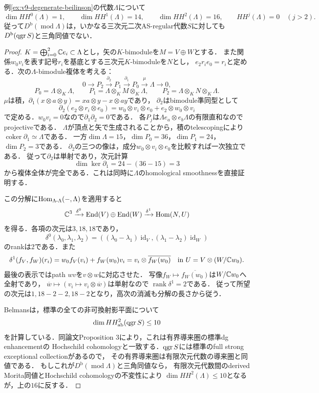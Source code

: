 \documentclass[11pt,a4paper]{ltjsarticle}
\begin{document}
\begin{proposition}
\label{prop:v9-degenerate-beilinson-hochschild}
例\ref{ex:v9-degenerate-beilinson}の代数$\Lambda$について
\[
 \dim HH^0(\Lambda)=1,\qquad
 \dim HH^1(\Lambda)=14,\qquad
 \dim HH^2(\Lambda)=16,
 \qquad HH^j(\Lambda)=0\quad(j>2).
\]
従って$D^{\mathrm b}(\operatorname{mod}\Lambda)$は，いかなる三次元二次AS-regular代数$S$に対しても
$D^{\mathrm b}(\operatorname{qgr} S)$と三角同値でない．
\end{proposition}
\begin{proof}
$K=\bigoplus_{i=0}^2\mathbb C e_i\subset\Lambda$とし，矢の$K$-bimoduleを$M=V\oplus W$とする．
また関係$w_0v_i$を表す記号$r_i$を基底とする三次元$K$-bimoduleを$N$とし，
$e_2r_ie_0=r_i$と定める．次の$\Lambda$-bimodule複体を考える：
\[
 0\longrightarrow P_2\xrightarrow{\partial_2}P_1
 \xrightarrow{\partial_1}P_0\xrightarrow{\mu}\Lambda\longrightarrow0,
\]
\[
 P_0=\Lambda\otimes_K\Lambda,\qquad
 P_1=\Lambda\otimes_K M\otimes_K\Lambda,\qquad
 P_2=\Lambda\otimes_K N\otimes_K\Lambda.
\]
$\mu$は積，$\partial_1(x\otimes a\otimes y)=xa\otimes y-x\otimes ay$であり，
$\partial_2$はbimodule準同型として
\[
 \partial_2(e_2\otimes r_i\otimes e_0)
 =w_0\otimes v_i\otimes e_0+e_2\otimes w_0\otimes v_i
\]
で定める．$w_0v_i=0$なので$\partial_1\partial_2=0$である．
各$P_j$は$\Lambda e_a\otimes e_b\Lambda$の有限直和なのでprojectiveである．
$\Lambda$が頂点と矢で生成されることから，積のtelescopingにより
$\operatorname{coker}\partial_1\simeq\Lambda$である．
一方$\dim\Lambda=15$，$\dim P_0=36$，$\dim P_1=24$，$\dim P_2=3$である．
$\partial_2$の三つの像は，成分$w_0\otimes v_i\otimes e_0$を比較すれば一次独立である．
従って$\partial_2$は単射であり，次元計算
\[
 \dim\ker\partial_1=24-(36-15)=3
\]
から複体全体が完全である．これは同時に$\Lambda$のhomological smoothnessを直接証明する．

この分解に$\operatorname{Hom}_{\Lambda\text{-}\Lambda}(-,\Lambda)$を適用すると
\[
 \mathbb C^3\xrightarrow{\delta^0}
 \operatorname{End}(V)\oplus\operatorname{End}(W)
 \xrightarrow{\delta^1}\operatorname{Hom}(N,U)
\]
を得る．各項の次元は$3,18,18$であり，
\[
 \delta^0(\lambda_0,\lambda_1,\lambda_2)
 =((\lambda_0-\lambda_1)\operatorname{id}_V,
   (\lambda_1-\lambda_2)\operatorname{id}_W)
\]
のrankは2である．また
\[
 \delta^1(f_V,f_W)(r_i)
 =w_0 f_V(v_i)+f_W(w_0)v_i
 =v_i\otimes\overline{f_W(w_0)}
 \quad\text{in }U=V\otimes(W/\mathbb C w_0).
\]
最後の表示ではpath $wv$を$v\otimes w$に対応させた．
写像$f_W\mapsto\overline{f_W(w_0)}$は$W/\mathbb C w_0$へ全射であり，
$\overline w\mapsto(v_i\mapsto v_i\otimes\overline w)$は単射なので
$\operatorname{rank}\delta^1=2$である．
従って所望の次元は$1,18-2-2,18-2$となり，高次の消滅も分解の長さから従う．

Belmans\cite[Table 1, p.~3]{BelmansHHPlanes}は，標準の全ての非可換射影平面について
\[
 \dim HH^2_{\mathrm{ab}}(\operatorname{qgr} S)\leq10
\]
を計算している．同論文Proposition 3により，これは有界導来圏の標準dg enhancementの
Hochschild cohomologyと一致する．$\operatorname{qgr} S$には標準のfull strong exceptional collectionがあるので，
その有界導来圏は有限次元代数の導来圏と同値である．
もしこれが$D^{\mathrm b}(\operatorname{mod}\Lambda)$と三角同値なら，
有限次元代数間のderived Morita同値とHochschild cohomologyの不変性により
$\dim HH^2(\Lambda)\leq10$となるが，上の$16$に反する．
\end{proof}
\end{document}

